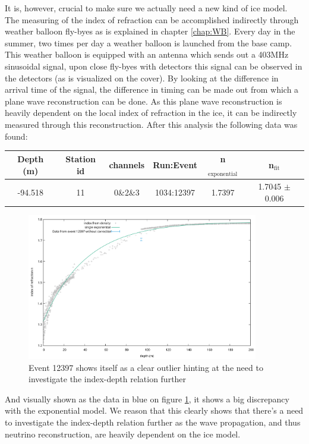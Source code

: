 \newpage
It is, however, crucial to make sure we actually need a new kind of ice model.
The measuring of the index of refraction can be accomplished indirectly through
weather balloon fly-byes as is explained in chapter \ref{chap:WB}. Every day in
the summer, two times per day a weather balloon is launched from the base camp.
This weather balloon is equipped with an antenna which sends out a 403MHz
sinusoidal signal, upon close fly-byes with detectors this signal can be
observed in the detectors (as is visualized on the cover). By looking at the
difference in arrival time of the signal, the difference in timing can be made
out from which a plane wave reconstruction can be done. As this plane wave
reconstruction is heavily dependent on the local index of refraction in the
ice, it can be indirectly measured through this reconstruction.  After this
analysis the following data was found:
\begin{center}
\begin{tabular}{||c c c c c c||}
 \hline
 Depth (m) & Station id & channels & Run:Event & n$_\text{exponential}$ & n$_\text{fit}$\\ [0.5ex]
 \hline\hline
 -94.518 & 11 & 0\&2\&3 & 1034:12397 & 1.7397 & 1.7045 $\pm$ 0.006 \\
 \hline
\end{tabular}
\end{center}
\begin{figure}
	\centering
	\includegraphics[width=0.9\textwidth]{figures/Event12397NoCorr.pdf}
  \caption{Event 12397 shows itself as a clear outlier hinting at the need to investigate the index-depth relation further}
  \label{fig:SumFinRes}
\end{figure}
And visually shown as the data in blue on figure \ref{fig:SumFinRes}, 
it shows a big discrepancy with the exponential model.
We reason that this clearly shows that there's a need to investigate
the index-depth relation further as the wave propagation, and thus
neutrino reconstruction, are heavily dependent on the ice model.
\newpage
